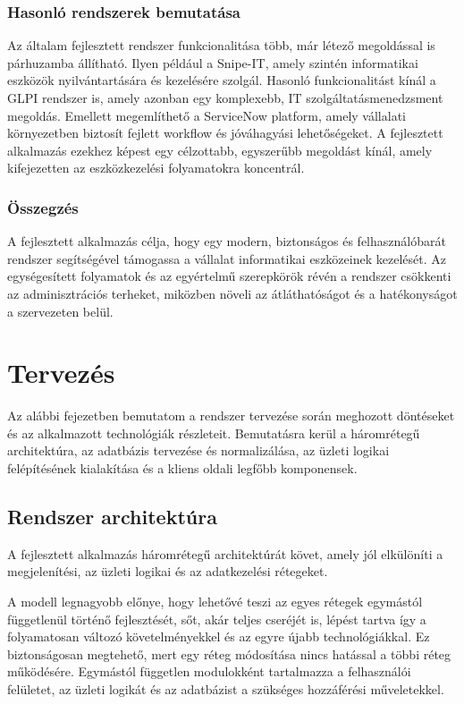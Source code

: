 \documentclass[
]{thesis-ekf}
\theoremstyle{definition}
\theoremstyle{remark}
\begin{document}
\subsection{Hasonló rendszerek bemutatása}

Az általam fejlesztett rendszer funkcionalitása több, már létező megoldással is párhuzamba állítható. Ilyen például a Snipe-IT, amely szintén informatikai eszközök nyilvántartására és kezelésére szolgál. Hasonló funkcionalitást kínál a GLPI rendszer is, amely azonban egy komplexebb, IT szolgáltatásmenedzsment megoldás. Emellett megemlíthető a ServiceNow platform, amely vállalati környezetben biztosít fejlett workflow és jóváhagyási lehetőségeket. A fejlesztett alkalmazás ezekhez képest egy célzottabb, egyszerűbb megoldást kínál, amely kifejezetten az eszközkezelési folyamatokra koncentrál.

\subsection{Összegzés}

A fejlesztett alkalmazás célja, hogy egy modern, biztonságos és felhasználóbarát rendszer segítségével támogassa a vállalat informatikai eszközeinek kezelését.  
Az egységesített folyamatok és az egyértelmű szerepkörök révén a rendszer csökkenti az adminisztrációs terheket, miközben növeli az átláthatóságot és a hatékonyságot a szervezeten belül.

\chapter{Tervezés}
Az alábbi fejezetben bemutatom a rendszer tervezése során meghozott döntéseket és az alkalmazott technológiák részleteit.
Bemutatásra kerül a háromrétegű architektúra, az adatbázis tervezése és normalizálása, az üzleti logikai felépítésének kialakítása és a kliens oldali legfőbb komponensek.

\section{Rendszer architektúra}
A fejlesztett alkalmazás háromrétegű architektúrát követ, amely jól elkülöníti a megjelenítési, az üzleti logikai és az adatkezelési rétegeket.

A modell legnagyobb előnye, hogy lehetővé teszi az egyes rétegek egymástól függetlenül történő fejlesztését, sőt, akár teljes cseréjét is, lépést tartva így a folyamatosan változó követelményekkel és az egyre újabb technológiákkal.
Ez biztonságosan megtehető, mert egy réteg módosítása nincs hatással a többi réteg működésére. Egymástól független modulokként tartalmazza a felhasználói felületet, az üzleti logikát és az adatbázist a szükséges hozzáférési műveletekkel. \cite{HáromrétegűArchitektúra}
\end{document}
